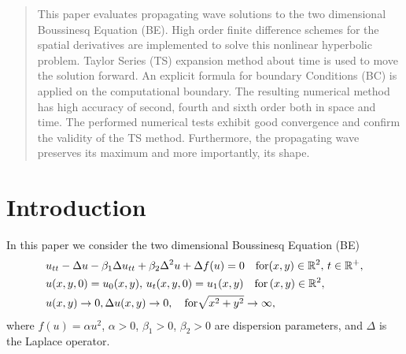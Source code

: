 \documentclass[a0,portrait]{a0poster}
\begin{document}
\begin{multicols}{2} %


\color{Navy} %

\begin{abstract}

This paper evaluates propagating wave solutions to the two dimensional Boussinesq Equation (BE). High order finite difference schemes for the spatial derivatives are implemented to solve this nonlinear hyperbolic problem. Taylor Series (TS) expansion method about time is used to move the solution forward. An explicit formula for boundary Conditions (BC) is applied on the computational boundary. The resulting numerical method has high accuracy of second, fourth and sixth order both in space and time. The performed numerical tests exhibit good convergence and confirm the validity of the TS method. Furthermore, the propagating wave preserves its maximum and more importantly, its shape.

\end{abstract}


\color{SaddleBrown} %

\section*{Introduction}

In this paper we  consider the two dimensional Boussinesq  Equation (BE)
\begin{align} \label{eq1}
&u_{tt} - \Delta u -\beta_1  \Delta u_{tt} +\beta_2 \Delta ^2 u + \Delta f(u)=0   \quad \text{for}  (x,y) \in \mathbb{R}^2, \, t\in\mathbb{R}^+, 
\\ \nonumber &u(x,y,0)=u_0(x,y), \, u_t(x,y,0)=u_1(x,y)   \quad\text{for} \, (x,y) \in \mathbb{R}^2,
\\  &u(x,y) \rightarrow 0,  \Delta u(x,y) \rightarrow 0 ,  \quad \text{for}  \sqrt{x^2 + y^2} \rightarrow \infty, \label{eq11}
\end{align}
where $f(u)=\alpha u^2$,  $\alpha>0$, $\beta_1>0$, $\beta_2>0$  are dispersion parameters, and $\Delta$ is the Laplace operator. 


\end{multicols}
\end{document}
